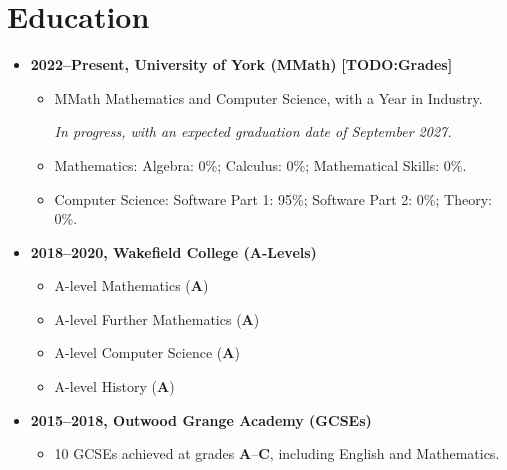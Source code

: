 \documentclass{article}
\makeatletter
\newcommand{\todomark}[1]{{\color{red}\textbf{[TODO:\@ #1]}}}
\makeatother
\begin{document}
\section{Education}
\begin{itemize}
        \item \textbf{2022--Present, University of York (MMath)}
        \todomark{Grades}
        \begin{itemize}
                \item MMath Mathematics and Computer Science, with a Year in
                Industry.

                \textit{In progress, with an expected graduation date of
                September 2027.}

                \item Mathematics: Algebra: 0\%; Calculus: 0\%; Mathematical
                Skills: 0\%.

                \item Computer Science: Software Part 1: 95\%; Software Part 2:
                0\%; Theory: 0\%.
        \end{itemize}
        \item \textbf{2018--2020, Wakefield College (A-Levels)}
        \begin{itemize}
                \item A-level Mathematics (\textbf{A})
                \item A-level Further Mathematics (\textbf{A})
                \item A-level Computer Science (\textbf{A})
                \item A-level History (\textbf{A})
        \end{itemize}
        \item \textbf{2015--2018, Outwood Grange Academy (GCSEs)}
        \begin{itemize}
                \item 10 GCSEs achieved at grades \textbf{A}--\textbf{C},
                including English and Mathematics.
        \end{itemize}
\end{itemize}

%
%
\end{document}
